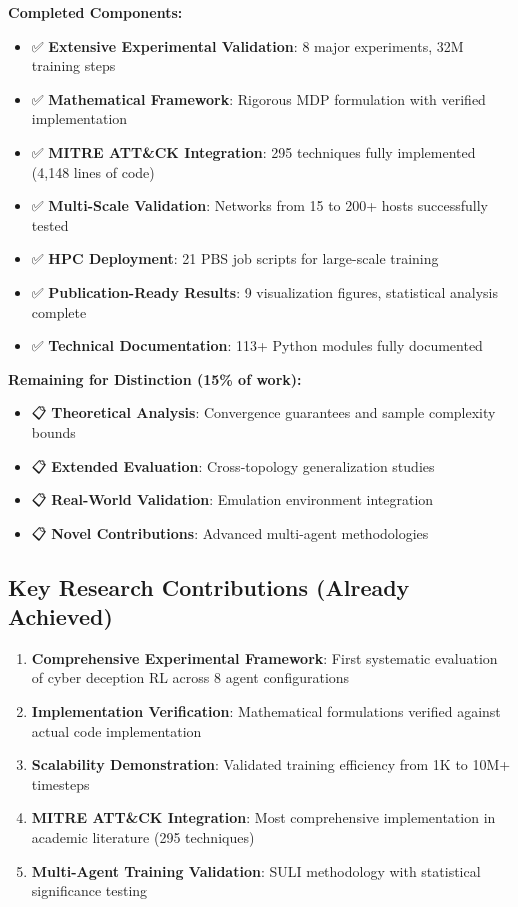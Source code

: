 \documentclass[11pt]{article}
\begin{document}
\textbf{Completed Components:}
\begin{itemize}
\item ✅ \textbf{Extensive Experimental Validation}: 8 major experiments, 32M training steps
\item ✅ \textbf{Mathematical Framework}: Rigorous MDP formulation with verified implementation
\item ✅ \textbf{MITRE ATT\&CK Integration}: 295 techniques fully implemented (4,148 lines of code)
\item ✅ \textbf{Multi-Scale Validation}: Networks from 15 to 200+ hosts successfully tested
\item ✅ \textbf{HPC Deployment}: 21 PBS job scripts for large-scale training
\item ✅ \textbf{Publication-Ready Results}: 9 visualization figures, statistical analysis complete
\item ✅ \textbf{Technical Documentation}: 113+ Python modules fully documented
\end{itemize}

\textbf{Remaining for Distinction (15\% of work):}
\begin{itemize}
\item 📋 \textbf{Theoretical Analysis}: Convergence guarantees and sample complexity bounds
\item 📋 \textbf{Extended Evaluation}: Cross-topology generalization studies
\item 📋 \textbf{Real-World Validation}: Emulation environment integration
\item 📋 \textbf{Novel Contributions}: Advanced multi-agent methodologies
\end{itemize}

\subsection{Key Research Contributions (Already Achieved)}

\begin{enumerate}
\item \textbf{Comprehensive Experimental Framework}: First systematic evaluation of cyber deception RL across 8 agent configurations
\item \textbf{Implementation Verification}: Mathematical formulations verified against actual code implementation
\item \textbf{Scalability Demonstration}: Validated training efficiency from 1K to 10M+ timesteps
\item \textbf{MITRE ATT\&CK Integration}: Most comprehensive implementation in academic literature (295 techniques)
\item \textbf{Multi-Agent Training Validation}: SULI methodology with statistical significance testing
\end{enumerate}
\end{document}
